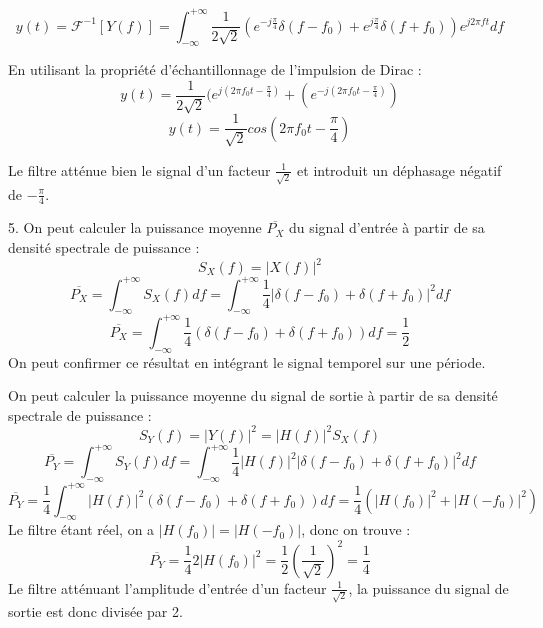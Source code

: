 \documentclass[11pt]{report}
\begin{document}
	\begin{equation*}
	y(t)=\mathcal{F}^{-1}[Y(f)]=\int_{-\infty}^{+\infty}\frac{1}{2\sqrt{2}}(e^{-j\frac{\pi}{4}}\delta(f-f_{0})+e^{j\frac{\pi}{4}}\delta(f+f_{0}))e^{j2\pi ft}df
	\end{equation*}
	
	En utilisant la propriété d'échantillonnage de l'impulsion de Dirac :
	\begin{equation*}
	y(t)=\frac{1}{2\sqrt{2}}(e^{j(2\pi f_{0}t-\frac{\pi}{4})}+(e^{-j(2\pi f_{0}t-\frac{\pi}{4})})
	\end{equation*}
	\begin{equation*}
	y(t)=\frac{1}{\sqrt{2}}cos(2\pi f_{0}t-\frac{\pi}{4})
	\end{equation*}
	
	Le filtre atténue bien le signal d'un facteur $\frac{1}{\sqrt{2}}$ et introduit un déphasage négatif de $-\frac{\pi}{4}$.
	
	\vspace{0.5\baselineskip}	
	
	5. On peut calculer la puissance moyenne $\overline{P_{X}}$ du signal d'entrée à partir de sa densité spectrale de puissance :
	\begin{equation*}
	S_{X}(f)=|X(f)|^{2}
	\end{equation*}
	\begin{equation*}
	\overline{P_{X}}=\int_{-\infty}^{+\infty}S_{X}(f)df=\int_{-\infty}^{+\infty}\frac{1}{4}|\delta(f-f_{0})+\delta(f+f_{0})|^{2}df
	\end{equation*}
	\begin{equation*}
	\overline{P_{X}}=\int_{-\infty}^{+\infty}\frac{1}{4}(\delta(f-f_{0})+\delta(f+f_{0}))df=\frac{1}{2}
	\end{equation*}
	On peut confirmer ce résultat en intégrant le signal temporel sur une période.
	
	On peut calculer la puissance moyenne du signal de sortie à partir de sa densité spectrale de puissance :
	\begin{equation*}
	S_{Y}(f)=|Y(f)|^{2}=|H(f)|^{2}S_{X}(f)
	\end{equation*}
	\begin{equation*}
	\overline{P_{Y}}=\int_{-\infty}^{+\infty}S_{Y}(f)df=\int_{-\infty}^{+\infty}\frac{1}{4}|H(f)|^{2}|\delta(f-f_{0})+\delta(f+f_{0})|^{2}df
	\end{equation*}
	\begin{equation*}
	\overline{P_{Y}}=\frac{1}{4}\int_{-\infty}^{+\infty}|H(f)|^{2}(\delta(f-f_{0})+\delta(f+f_{0}))df=\frac{1}{4}(|H(f_{0})|^{2}+|H(-f_{0})|^{2})
	\end{equation*}
	Le filtre étant réel, on a $|H(f_{0})|=|H(-f_{0})|$, donc on trouve : 
	\begin{equation*}
	\overline{P_{Y}}=\frac{1}{4}2|H(f_{0})|^{2}=\frac{1}{2}(\frac{1}{\sqrt{2}})^{2}=\frac{1}{4}
	\end{equation*}
	Le filtre atténuant l'amplitude d'entrée d'un facteur $\frac{1}{\sqrt{2}}$, la puissance du signal de sortie est donc divisée par 2.
	
\end{document}
